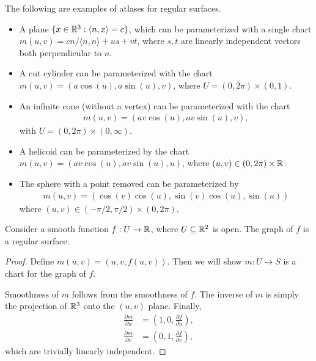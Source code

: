 \begin{exmp}
    The following are examples of atlases for regular surfaces.
    \begin{itemize}
        \item A plane $\{x \in \mathbb{R}^3 : \langle n, x\rangle = c\}$, which can be parameterized with a single chart $m(u, v) = cn/\langle n, n \rangle + us + vt$, where $s, t$ are linearly independent vectors both perpendicular to $n$.
        \item A cut cylinder can be parameterized with the chart $m(u, v) = (a\cos(u), a\sin(u), v)$, where $U = (0, 2\pi) \times (0, 1)$.
        \item An infinite cone (without a vertex) can be parameterized with the chart
        \begin{align*}
            m(u, v) = (av\cos(u), av\sin(u), v),
        \end{align*}
        with $U = (0, 2\pi) \times (0, \infty)$.
        \item A helicoid can be parameterized by the chart $m(u, v) = (av\cos(u), av\sin(u), u)$, where $(u, v) \in (0, 2\pi) \times \mathbb{R}$.
        \item The sphere with a point removed can be parameterized by
        \begin{align*}
            m(u, v) = (\cos(v)\cos(u), \sin(v)\cos(u), \sin(u))
        \end{align*}
        where $(u, v) \in (-\pi/2, \pi/2) \times (0, 2\pi)$.
    \end{itemize}
\end{exmp}

\begin{prop}
    Consider a smooth function $f: U \to \mathbb{R}$, where $U \subseteq \mathbb{R}^2$ is open. The graph of $f$ is a regular surface.
\end{prop}

\begin{proof}
    Define $m(u, v) = (u, v, f(u, v))$. Then we will show $m: U \to S$ is a chart for the graph of $f$.

    Smoothness of $m$ follows from the smoothness of $f$. The inverse of $m$ is simply the projection of $\mathbb{R}^3$ onto the $(u, v)$ plane. Finally,
    \begin{align*}
        \frac{\partial m}{\partial u} &= (1, 0, \frac{\partial f}{\partial u}), \\
        \frac{\partial m}{\partial v} &= (0, 1, \frac{\partial f}{\partial v}),
    \end{align*}
    which are trivially linearly independent.
\end{proof}

